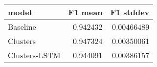 \begin{tabular}{lrr}
\toprule
 model         &   F1 mean &   F1 stddev \\
\midrule
 Baseline      &  0.942432 &  0.00466489 \\
 Clusters      &  0.947324 &  0.00350061 \\
 Clusters-LSTM &  0.944091 &  0.00386157 \\
\bottomrule
\end{tabular}